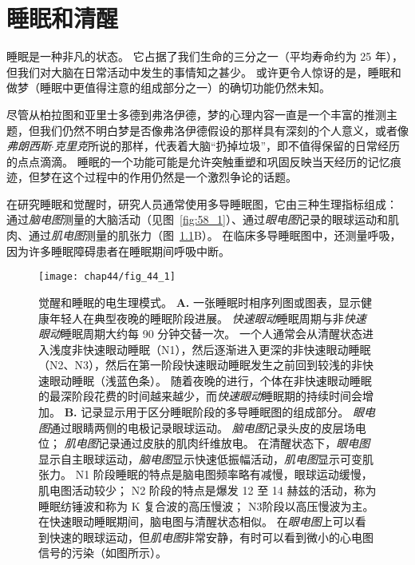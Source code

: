 \chapter{睡眠和清醒} \label{chap:chap44}

睡眠是一种非凡的状态。
它占据了我们生命的三分之一（平均寿命约为 25 年），但我们对大脑在日常活动中发生的事情知之甚少。
或许更令人惊讶的是，睡眠和做梦（睡眠中更值得注意的组成部分之一）的确切功能仍然未知。


尽管从柏拉图和亚里士多德到弗洛伊德，梦的心理内容一直是一个丰富的推测主题，但我们仍然不明白梦是否像弗洛伊德假设的那样具有深刻的个人意义，或者像\textit{弗朗西斯$\cdot$克里克}所说的那样，代表着大脑“扔掉垃圾”，即不值得保留的日常经历的点点滴滴。
睡眠的一个功能可能是允许突触重塑和巩固反映当天经历的记忆痕迹，但梦在这个过程中的作用仍然是一个激烈争论的话题。


在研究睡眠和觉醒时，研究人员通常使用多导睡眠图，它由三种生理指标组成：
通过\textit{脑电图}测量的大脑活动（见图~\ref{fig:58_1}）、通过\textit{眼电图}记录的眼球运动和肌肉、通过\textit{肌电图}测量的肌张力（图~\ref{fig:44_1}B）。
在临床多导睡眠图中，还测量呼吸，因为许多睡眠障碍患者在睡眠期间呼吸中断。


\begin{figure}[htbp]
	\centering
	\texttt{[image: chap44/fig\_44\_1]}
	\caption{觉醒和睡眠的电生理模式。
		\textbf{A.} 一张睡眠时相序列图或图表，显示健康年轻人在典型夜晚的睡眠阶段进展。
		\textit{快速眼动}睡眠周期与非\textit{快速眼动}睡眠周期大约每 90 分钟交替一次。
		一个人通常会从清醒状态进入浅度非快速眼动睡眠（N1），然后逐渐进入更深的非快速眼动睡眠（N2、N3），然后在第一阶段快速眼动睡眠发生之前回到较浅的非快速眼动睡眠（浅蓝色条）。
		随着夜晚的进行，个体在非快速眼动睡眠的最深阶段花费的时间越来越少，而\textit{快速眼动}睡眠期的持续时间会增加。
		\textbf{B.} 记录显示用于区分睡眠阶段的多导睡眠图的组成部分。
		\textit{眼电图}通过眼睛两侧的电极记录眼球运动。
		\textit{脑电图}记录头皮的皮层场电位； \textit{肌电图}记录通过皮肤的肌肉纤维放电。
		在清醒状态下，\textit{眼电图}显示自主眼球运动，\textit{脑电图}显示快速低振幅活动，\textit{肌电图}显示可变肌张力。
		N1 阶段睡眠的特点是脑电图频率略有减慢，眼球运动缓慢，肌电图活动较少；
		N2 阶段的特点是爆发 12 至 14 赫兹的活动，称为睡眠纺锤波和称为 K 复合波的高压慢波；
		N3阶段以高压慢波为主。
		在快速眼动睡眠期间，脑电图与清醒状态相似。
		在\textit{眼电图}上可以看到快速的眼球运动，但\textit{肌电图}非常安静，有时可以看到微小的心电图信号的污染（如图所示）。}
	\label{fig:44_1}
\end{figure}


